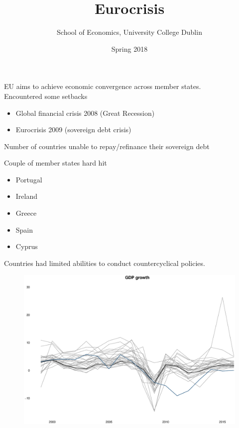 \documentclass{beamer}
\title{Eurocrisis}
\author{School of Economics, University College Dublin}
\date{Spring 2018}
\begin{document}
\begin{frame}
 \titlepage
\end{frame}

\begin{frame}
 EU aims to achieve economic convergence across member states.\\
 Encountered some setbacks
 \begin{itemize}
   \item Global financial crisis 2008 (Great Recession)
   \item Eurocrisis 2009 (sovereign debt crisis)
 \end{itemize}
 \medskip
 Number of countries unable to repay/refinance their sovereign debt
\end{frame}

\begin{frame}
  Couple of member states hard hit
  \begin{itemize}
    \item Portugal
    \item Ireland
    \item Greece
    \item Spain
    \medskip
    \item Cyprus
  \end{itemize}
  \medskip
  Countries had limited abilities to conduct countercyclical policies.
\end{frame}

\begin{frame}
  \begin{figure}
    \includegraphics[scale=.3]{gdp_growth.eps}
  \end{figure}
\end{frame}
\end{document}
